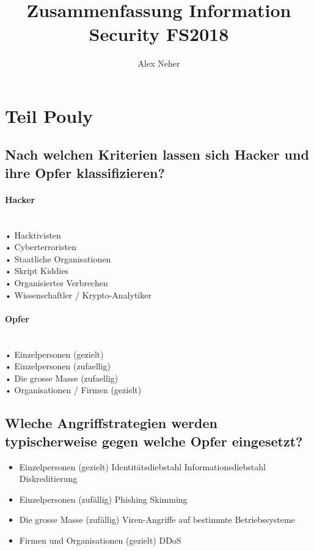 \documentclass[a4paper, 11pt, nofootinbib]{article}
\begin{document}
\title{Zusammenfassung Information Security FS2018}
\author{Alex Neher}
\maketitle

\tableofcontents
\newpage
\listoffigures
\newpage

\graphicspath{{./Pictures/}}

\section{Teil Pouly}
\subsection{Nach welchen Kriterien lassen sich Hacker und ihre Opfer klassifizieren?}

\paragraph{Hacker}\mbox{}\\

\noindent • Hacktivisten\\
• Cyberterroristen\\
• Staatliche Organisationen\\
• Skript Kiddies\\
• Organisiertes Verbrechen\\
• Wissenschaftler / Krypto-Analytiker\\

\paragraph{Opfer}\mbox{}\\

\noindent • Einzelpersonen (gezielt)\\
• Einzelpersonen (zufaellig)\\
• Die grosse Masse (zufaellig)\\
• Organisationen / Firmen (gezielt)\\

\subsection{Wleche Angriffstrategien werden typischerweise gegen welche Opfer eingesetzt?}

\begin{itemize}
	\item Einzelpersonen (gezielt)
		\subitem Identitätsdiebstahl
		\subitem Informationsdiebstahl
		\subitem Diskreditierung
	\item Einzelpersonen (zufällig)
		\subitem Phishing
		\subitem Skimming
	\item Die grosse Masse (zufällig)
		\subitem Viren-Angriffe auf bestimmte Betriebssysteme
	\item Firmen und Organisationen (gezielt)
		\subitem DDoS
\end{itemize}
\end{document}
